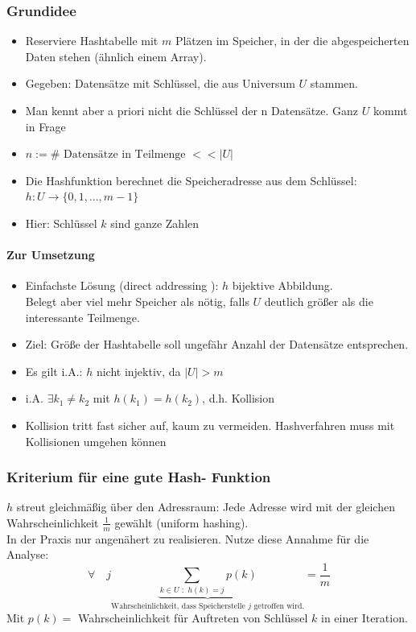 \documentclass[fleqn]{scrartcl}
\begin{document}
\subsubsection{Grundidee}
\begin{itemize}
\item Reserviere Hashtabelle mit $m$ Plätzen im Speicher, in der die abgespeicherten Daten stehen (ähnlich einem Array).
\item Gegeben: Datensätze mit Schlüssel, die aus Universum $U$ stammen.
\item Man kennt aber a priori nicht die Schlüssel der n Datensätze. Ganz $U$ kommt in Frage
\item $n := \# \text{ Datensätze in Teilmenge } << |U|$
\item Die Hashfunktion berechnet die Speicheradresse aus dem Schlüssel:
\subitem $h: U \rightarrow \{0, 1, ..., m-1\}$
\item Hier: Schlüssel $k$ sind ganze Zahlen
\end{itemize}

\paragraph*{Zur Umsetzung}
\begin{itemize}
\item Einfachste Lösung (\glqq direct addressing \grqq): $h$ bijektive Abbildung.\\
Belegt aber viel mehr Speicher als nötig, falls $U$ deutlich größer als die interessante Teilmenge.
\item Ziel: Größe der Hashtabelle soll ungefähr Anzahl der Datensätze entsprechen.
\item Es gilt i.A.: $h$ nicht injektiv, da $|U| > m$
\item i.A. $\exists k_1 \neq k_2$ mit $h(k_1) = h(k_2)$, d.h. Kollision
\item Kollision tritt fast sicher auf, kaum zu vermeiden. Hashverfahren muss mit Kollisionen umgehen können
\end{itemize}

\subsubsection{Kriterium für eine gute Hash- Funktion}
$h$ streut gleichmäßig über den Adressraum:
Jede Adresse wird mit der gleichen Wahrscheinlichkeit $\frac{1}{m}$ gewählt (\glqq uniform hashing\grqq).\\
In der Praxis nur angenähert zu realisieren.
Nutze diese Annahme für die Analyse:
\[\forall \quad j \underbrace{\sum_{k \in U \,\, : \,\, h(k) = j} p(k)}_{\text{Wahrscheinlichkeit, dass Speicherstelle $j$ getroffen wird.}} = \frac{1}{m}\]
Mit $p(k) = $ Wahrscheinlichkeit für Auftreten von Schlüssel $k$ in einer Iteration.\\
\end{document}
